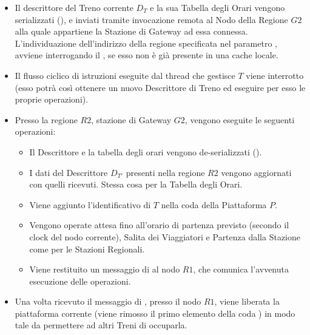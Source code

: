\begin{itemize}
		\item Il descrittore del Treno corrente $D_T$ e la sua Tabella degli Orari vengono serializzati (), e inviati tramite invocazione remota al Nodo della Regione $G2$ alla quale appartiene la Stazione di Gateway ad essa connessa. L'individuazione dell'indirizzo della regione specificata nel parametro , avviene interrogando il , se esso non è già presente in una cache locale.
		\item Il flusso ciclico di istruzioni eseguite dal thread che gestisce $T$ viene interrotto (esso potrà così ottenere un nuovo Descrittore di Treno ed eseguire per esso le proprie operazioni).
		\item Presso la regione $R2$, stazione di Gateway $G2$, vengono eseguite le seguenti operazioni:
			\begin{itemize}
				\item Il Descrittore e la tabella degli orari vengono de-serializzati ().
				\item I dati del Descrittore $D_{T'}$ presenti nella regione $R2$ vengono aggiornati con quelli ricevuti. Stessa cosa per la Tabella degli Orari.
				\item Viene aggiunto l'identificativo di $T$ nella coda  della Piattaforma $P$.
				\item Vengono operate attesa fino all'orario di partenza previsto (secondo il clock del nodo corrente), Salita dei Viaggiatori e Partenza dalla Stazione come per le Stazioni Regionali.
				\item Viene restituito un messaggio di  al nodo $R1$, che comunica l'avvenuta esecuzione delle operazioni.
			\end{itemize}
		\item Una volta ricevuto il messaggio di , presso il nodo $R1$, viene liberata la piattaforma corrente (viene rimosso il primo elemento della coda ) in modo tale da permettere ad altri Treni di occuparla.
	\end{itemize}
	
